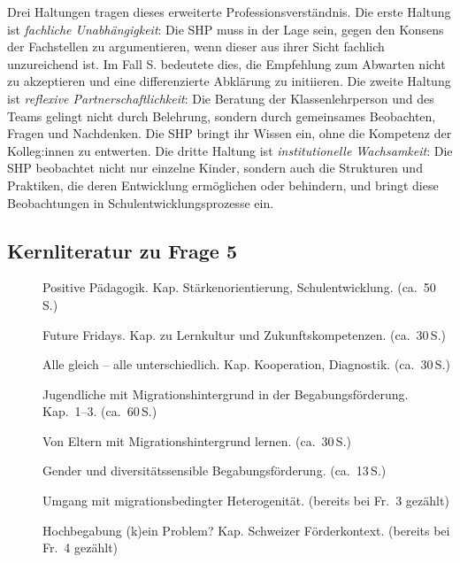 \documentclass[ngerman, a4paper]{article}
\begin{document}
Drei Haltungen tragen dieses erweiterte Professionsverständnis. Die erste
Haltung ist \textit{fachliche Unabhängigkeit}: Die SHP muss in der Lage sein,
gegen den Konsens der Fachstellen zu argumentieren, wenn dieser aus ihrer Sicht
fachlich unzureichend ist. Im Fall S. bedeutete dies, die Empfehlung zum
Abwarten nicht zu akzeptieren und eine differenzierte Abklärung zu initiieren.
Die zweite Haltung ist \textit{reflexive Partnerschaftlichkeit}: Die Beratung
der Klassenlehrperson und des Teams gelingt nicht durch Belehrung, sondern
durch gemeinsames Beobachten, Fragen und Nachdenken. Die SHP bringt ihr Wissen
ein, ohne die Kompetenz der Kolleg:innen zu entwerten. Die dritte Haltung ist
\textit{institutionelle Wachsamkeit}: Die SHP beobachtet nicht nur einzelne
Kinder, sondern auch die Strukturen und Praktiken, die deren Entwicklung
ermöglichen oder behindern, und bringt diese Beobachtungen in
Schulentwicklungsprozesse ein.

 
\subsection{Kernliteratur zu Frage 5}
 
\begin{description}
  \item[\cite{burow2021positive}] Positive Pädagogik. Kap. Stärkenorientierung, Schulentwicklung. (ca.~50\,S.)
  \item[\cite{burow2020future}] Future Fridays. Kap. zu Lernkultur und Zukunftskompetenzen. (ca.~30\,S.)
  \item[\cite{buholzer2010allegleich}] Alle gleich -- alle unterschiedlich. Kap. Kooperation, Diagnostik. (ca.~30\,S.)
  \item[\cite{leikhof2021jugendliche}] Jugendliche mit Migrationshintergrund in der Begabungsförderung. Kap.~1--3. (ca.~60\,S.)
  \item[\cite{kosoroklabhart2021voneltern}] Von Eltern mit Migrationshintergrund lernen. (ca.~30\,S.)
  \item[\cite{macha2019gender}] Gender und diversitätssensible Begabungsförderung. (ca.~13\,S.)
  \item[\cite{kappus2010migration}] Umgang mit migrationsbedingter Heterogenität. (bereits bei Fr.~3 gezählt)
  \item[\cite{brunner2021hochbegabung}] Hochbegabung (k)ein Problem?
    Kap. Schweizer Förderkontext. (bereits bei Fr.~4 gezählt)
\end{description}
 
\end{document}
